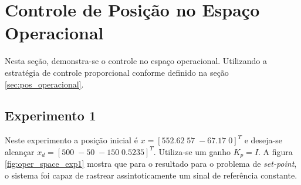 \section{Controle de Posição no Espaço Operacional}

Nesta seção, demonstra-se o controle no espaço operacional. Utilizando a estratégia de controle proporcional conforme definido na seção \ref{sec:pos_operacional}. 

\subsection{Experimento 1}

Neste experimento a posição inicial é ${x} =[ 552.62 \; 57 \; -67.17 \; 0]^T$ e deseja-se alcançar ${x}_d =[ 500 \; -50 \; -150 \; 0.5235]^T$. Utiliza-se um ganho ${K}_p = {I}$. A figura \ref{fig:oper_space_exp1} mostra que para o resultado para o problema de \textit{set-point}, o sistema foi capaz de rastrear assintoticamente um sinal de referência constante. 

